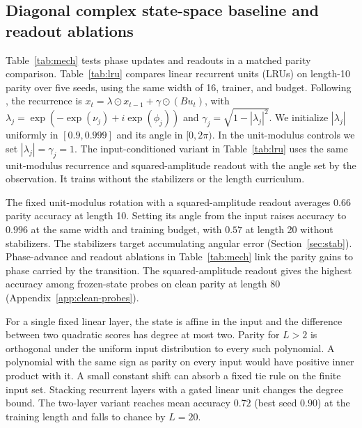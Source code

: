 

\subsection{Diagonal complex state-space baseline and readout ablations}
\label{app:lru}
\label{sec:ablation}
\label{sec:priorart}
Table~\ref{tab:mech} tests phase updates and readouts in a matched parity
comparison. Table~\ref{tab:lru} compares linear recurrent units (LRUs) on
length-10 parity over five seeds, using the same width of 16, trainer, and
budget.
Following \citet{orvieto2023lru}, the recurrence is
$x_t=\lambda\odot x_{t-1}+\gamma\odot(Bu_t)$, with
$\lambda_j=\exp(-\exp(\nu_j)+i\exp(\phi_j))$ and
$\gamma_j=\sqrt{1-|\lambda_j|^2}$. We initialize $|\lambda_j|$ uniformly
in $[0.9,0.999]$ and its angle in $[0,2\pi)$. In the unit-modulus
controls we set $|\lambda_j|=\gamma_j=1$. The input-conditioned variant in
Table~\ref{tab:lru} uses the same unit-modulus recurrence and squared-amplitude
readout with the angle set by the observation. It trains without the
stabilizers or the length curriculum.

The fixed unit-modulus rotation with a squared-amplitude readout averages
$0.66$ parity accuracy at length 10. Setting its angle from the input
raises accuracy to $0.996$ at the same width and training budget, with
$0.57$ at length 20 without stabilizers. The stabilizers target accumulating
angular error (Section~\ref{sec:stab}). Phase-advance and readout ablations
in Table~\ref{tab:mech} link the parity gains to phase carried by the
transition. The squared-amplitude readout gives the highest accuracy
among frozen-state probes on clean parity at length 80
(Appendix~\ref{app:clean-probes}).

For a single fixed linear layer, the state is affine in the input and the
difference between two quadratic scores has degree at most two. Parity
for $L>2$ is orthogonal under the uniform input distribution to every
such polynomial. A polynomial with the same sign as parity on every input
would have positive inner product with it. A small constant shift can absorb
a fixed tie rule on the finite input set. Stacking recurrent layers with a
gated linear unit changes the degree bound.
The two-layer variant reaches mean accuracy $0.72$ (best seed
$0.90$) at the training length and falls to chance by $L=20$.



